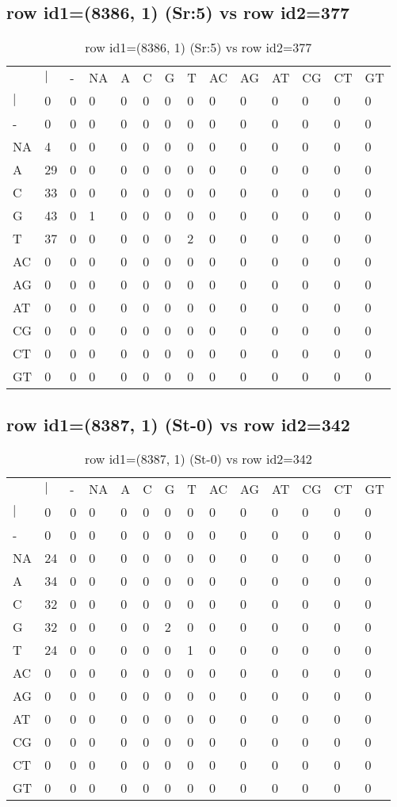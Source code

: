 \subsection{row id1=(8386, 1) (Sr:5) vs row id2=377}
\begin{center}
\begin{longtable}{|l|l|l|l|l|l|l|l|l|l|l|l|l|l|}
\caption{row id1=(8386, 1) (Sr:5) vs row id2=377} \label{table_dm634}\\
\hline
\\
\hline
&$|$&-&NA&A&C&G&T&AC&AG&AT&CG&CT&GT\\
$|$&0&0&0&0&0&0&0&0&0&0&0&0&0\\
-&0&0&0&0&0&0&0&0&0&0&0&0&0\\
NA&4&0&0&0&0&0&0&0&0&0&0&0&0\\
A&29&0&0&0&0&0&0&0&0&0&0&0&0\\
C&33&0&0&0&0&0&0&0&0&0&0&0&0\\
G&43&0&1&0&0&0&0&0&0&0&0&0&0\\
T&37&0&0&0&0&0&2&0&0&0&0&0&0\\
AC&0&0&0&0&0&0&0&0&0&0&0&0&0\\
AG&0&0&0&0&0&0&0&0&0&0&0&0&0\\
AT&0&0&0&0&0&0&0&0&0&0&0&0&0\\
CG&0&0&0&0&0&0&0&0&0&0&0&0&0\\
CT&0&0&0&0&0&0&0&0&0&0&0&0&0\\
GT&0&0&0&0&0&0&0&0&0&0&0&0&0\\
\hline
\end{longtable}
\end{center}

\subsection{row id1=(8387, 1) (St-0) vs row id2=342}
\begin{center}
\begin{longtable}{|l|l|l|l|l|l|l|l|l|l|l|l|l|l|}
\caption{row id1=(8387, 1) (St-0) vs row id2=342} \label{table_dm636}\\
\hline
\\
\hline
&$|$&-&NA&A&C&G&T&AC&AG&AT&CG&CT&GT\\
$|$&0&0&0&0&0&0&0&0&0&0&0&0&0\\
-&0&0&0&0&0&0&0&0&0&0&0&0&0\\
NA&24&0&0&0&0&0&0&0&0&0&0&0&0\\
A&34&0&0&0&0&0&0&0&0&0&0&0&0\\
C&32&0&0&0&0&0&0&0&0&0&0&0&0\\
G&32&0&0&0&0&2&0&0&0&0&0&0&0\\
T&24&0&0&0&0&0&1&0&0&0&0&0&0\\
AC&0&0&0&0&0&0&0&0&0&0&0&0&0\\
AG&0&0&0&0&0&0&0&0&0&0&0&0&0\\
AT&0&0&0&0&0&0&0&0&0&0&0&0&0\\
CG&0&0&0&0&0&0&0&0&0&0&0&0&0\\
CT&0&0&0&0&0&0&0&0&0&0&0&0&0\\
GT&0&0&0&0&0&0&0&0&0&0&0&0&0\\
\hline
\end{longtable}
\end{center}

